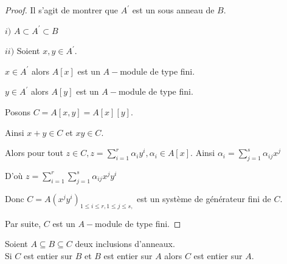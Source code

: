\begin{proof}
	Il s'agit de montrer que $A^{\prime }$ est un sous anneau de $B.$
	
	$i)$ $A\subset A^{\prime }\subset B$
	
	$ii)$ Soient $x,y\in A^{\prime }.$
	
	$x\in A^{\prime }$ alors $A[x]$ est un $A-$module de type fini.
	
	$y\in A^{\prime }$ alors $A[y]$ est un $A-$module de type fini.
	
	Posons $C=A[x,y]=A[x][y].$
	
	Ainsi $x+y\in C$ et $xy\in C$.
	
	Alors pour tout $z\in C,z=\sum\limits_{i=1}^{r}\alpha _{i}y^{i},\alpha
	_{i}\in A[x].$ Ainsi $\alpha _{i}=\sum\limits_{j=1}^{s}\alpha _{ij}x^{j}$
	
	D'où $z=\sum\limits_{i=1}^{r}\sum\limits_{j=1}^{s}\alpha _{ij}x^{j}y^{i}$
	
	Donc $C=A(x^{j}y^{i})_{1\leq i\leq r,1\leq j\leq s,}$ est un système de générateur fini de $C.$
	
	Par suite, $C$ est un $A-$module de type fini.
\end{proof}
\newpage
\begin{moncorollaire}
	Soient $A \subseteq B \subseteq C $ deux inclusions d'anneaux.\\
	Si $C$ est entier sur $B$ et $B$ est entier sur $A$ alors $C$ est entier sur $A$.
\end{moncorollaire}
